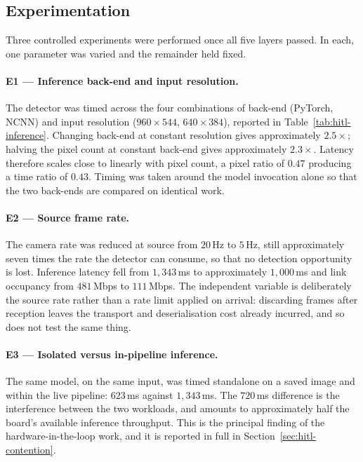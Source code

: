 \subsection{Experimentation}
\label{sec:test-experiments}

Three controlled experiments were performed once all five layers passed. In
each, one parameter was varied and the remainder held fixed.

\paragraph{E1 --- Inference back-end and input resolution.}
The detector was timed across the four combinations of back-end (PyTorch,
NCNN) and input resolution ($960 \times 544$, $640 \times 384$), reported in
Table~\ref{tab:hitl-inference}. Changing back-end at constant resolution
gives approximately $2.5\times$; halving the pixel count at constant
back-end gives approximately $2.3\times$. Latency therefore scales close to
linearly with pixel count, a pixel ratio of $0.47$ producing a time ratio of
$0.43$. Timing was taken around the model invocation alone so that the two
back-ends are compared on identical work.

\paragraph{E2 --- Source frame rate.}
The camera rate was reduced at source from $20$\,Hz to $5$\,Hz, still
approximately seven times the rate the detector can consume, so that no
detection opportunity is lost. Inference latency fell from $1{,}343$\,ms to
approximately $1{,}000$\,ms and link occupancy from $481$\,Mbps to
$111$\,Mbps. The independent variable is deliberately the source rate rather
than a rate limit applied on arrival: discarding frames after reception
leaves the transport and deserialisation cost already incurred, and so does
not test the same thing.

\paragraph{E3 --- Isolated versus in-pipeline inference.}
The same model, on the same input, was timed standalone on a saved image and
within the live pipeline: $623$\,ms against $1{,}343$\,ms. The $720$\,ms
difference is the interference between the two workloads, and amounts to
approximately half the board's available inference throughput. This is the
principal finding of the hardware-in-the-loop work, and it is reported in
full in Section~\ref{sec:hitl-contention}.

